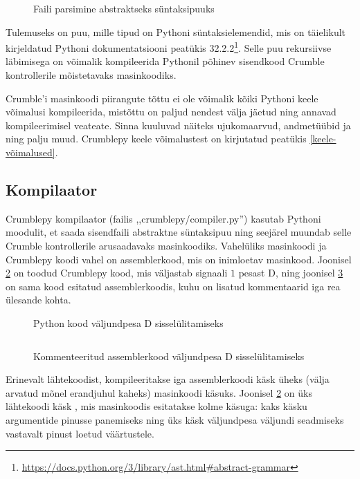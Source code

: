 \documentclass[12pt]{article}
\begin{document}
\begin{figure}[ht]
	\caption{Faili parsimine abstraktseks süntaksipuuks}
	\label{astparse}
\end{figure}

Tulemuseks on puu, mille tipud on Pythoni süntaksielemendid, mis on täielikult kirjeldatud Pythoni dokumentatsiooni peatükis 32.2.2\footnote{\url{https://docs.python.org/3/library/ast.html#abstract-grammar}}. Selle puu rekursiivse läbimisega on võimalik kompileerida Pythonil põhinev sisendkood Crumble kontrollerile mõistetavaks masinkoodiks.

Crumble'i masinkoodi piirangute tõttu ei ole võimalik kõiki Pythoni keele võimalusi kompileerida, mistõttu on paljud nendest välja jäetud ning annavad kompileerimisel veateate. Sinna kuuluvad näiteks ujukomaarvud, andmetüübid  ja  ning palju muud. Crumblepy keele võimalustest on kirjutatud peatükis \ref{keele-võimalused}.

\subsection{Kompilaator}

Crumblepy kompilaator (failis ,,crumblepy/compiler.py'') kasutab Pythoni  moodulit, et saada sisendfaili abstraktne süntaksipuu ning seejärel muundab selle Crumble kontrollerile arusaadavaks masinkoodiks. Vahelüliks masinkoodi ja Crumblepy koodi vahel on assemblerkood, mis on inimloetav masinkood. Joonisel \ref{denable} on toodud Crumblepy kood, mis väljastab signaali $1$ pesast D, ning joonisel \ref{denable-assembly} on sama kood esitatud assemblerkoodis, kuhu on lisatud kommentaarid iga rea ülesande kohta.

\begin{figure}[ht]
	\caption{Python kood väljundpesa D sisselülitamiseks}
	\label{denable}
\end{figure}

\begin{figure}[ht]
	\inputminted{text}{d-enable-asm.crpy}
	\caption{Kommenteeritud assemblerkood väljundpesa D sisselülitamiseks}
	\label{denable-assembly}
\end{figure}

Erinevalt lähtekoodist, kompileeritakse iga assemblerkoodi käsk üheks (välja arvatud mõnel erandjuhul kaheks) masinkoodi käsuks. Joonisel \ref{denable} on üks lähtekoodi käsk , mis masinkoodis esitatakse kolme käsuga: kaks käsku argumentide pinusse panemiseks ning üks käsk väljundpesa väljundi seadmiseks vastavalt pinust loetud väärtustele.
\end{document}
